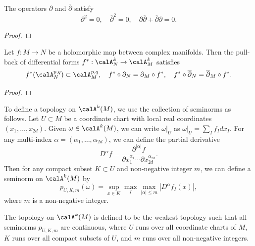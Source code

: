     \begin{proposition}\label{prop:partial_and_partial_bar_are_differential_operators}
        The operators \(\partial\) and \(\overline{\partial}\) satisfy
        \[ \partial^2 = 0, \quad \overline{\partial}^2 = 0, \quad \partial \overline{\partial} + \overline{\partial} \partial = 0. \]
    \end{proposition}
    \begin{proof}
    \end{proof}

    \begin{proposition}\label{prop:holomorphic_pull_back_compatiable_with_A^pq}
        Let \(f: M \to N\) be a holomorphic map between complex manifolds.
        Then the pull-back of differential forms \(f^*: \calA^{k}_N \to \calA^{k}_M\) satisfies
        \[ f^*(\calA^{p,q}_N) \subset \calA^{p,q}_M, \quad f^* \circ \partial_N = \partial_M \circ f^*, \quad f^* \circ \overline{\partial}_N = \overline{\partial}_M \circ f^*. \]
    \end{proposition}
    \begin{proof}
    \end{proof}

    \begin{construction}
        To define a topology on \(\calA^{k}(M)\), we use the collection of seminorms as follows.
        Let \(U \subset M\) be a coordinate chart with local real coordinates \((x_1, \ldots, x_{2d})\).
        Given \(\omega \in \calA^{k}(M)\), we can write \(\omega|_U\) as \(\omega|_U = \sum_I f_I d x_I\).
        For any multi-index \(\alpha = (\alpha_1, \ldots, \alpha_{2d})\), we can define the partial derivative
        \[ D^{\alpha} f = \frac{\partial^{|\alpha|} f}{\partial x_1^{\alpha_1} \cdots \partial x_{2d}^{\alpha_{2d}}}. \]
        Then for any compact subset \(K \subset U\) and non-negative integer \(m\), we can define a seminorm on \(\calA^{k}(M)\) by
        \[ p_{U, K, m}(\omega) = \sup_{x \in K} \max_{I} \max_{|\alpha| \leq m} |D^{\alpha} f_I(x)|, \]
        where \(m\) is a non-negative integer.

        The topology on \(\calA^{k}(M)\) is defined to be the weakest topology such that all seminorms \(p_{U, K, m}\) are continuous, where \(U\) runs over all coordinate charts of \(M\), \(K\) runs over all compact subsets of \(U\), and \(m\) runs over all non-negative integers.
    \end{construction}
    

